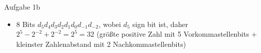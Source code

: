 \begin{frame}{Aufgabe 1b}
    \begin{Sidenote}
        \begin{itemize}
		\item $8$ Bits $d_5 d_4 d_3 d_2 d_1 d_0 d_{-1} d_{-2}$, wobei $d_5$ sign bit ist, daher $2^5 - 2^{-2} + 2^{-2} = 2^5 = 32$ (größte positive Zahl mit 5 Vorkommastellenbits + kleinster Zahlenabstand mit 2 Nachkommastellenbits)
        \end{itemize}
    \end{Sidenote}
\end{frame}
